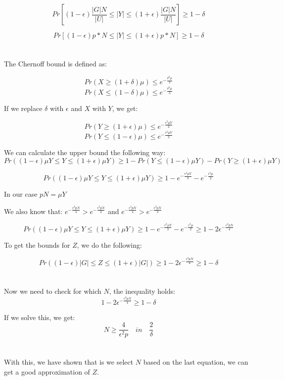 \documentclass[11pt]{article}
\begin{document}
$$ Pr \left[(1-\epsilon) \frac{|G|N}{|U|} \leq |Y| \leq (1+\epsilon)\frac{|G|N}{|U|} \right] \geq 1-\delta $$

$$ Pr \left[(1-\epsilon) p*N \leq |Y| \leq (1+\epsilon) p*N \right] \geq 1-\delta $$
\\~\\
The Chernoff bound is defined as:

$$ Pr(X \geq (1 + \delta) \mu) \leq e^{-\frac{\delta ^ 2 \mu}{2}}  $$
$$ Pr(X \leq (1 - \delta) \mu) \leq e^{-\frac{\delta ^ 2 \mu}{3}}  $$

If we replace $ \delta $ with $ \epsilon $ and $ X $ with $ Y $, we get:

$$ Pr(Y \geq (1 + \epsilon) \mu) \leq e^{-\frac{\epsilon ^ 2 \mu Y}{2}}  $$
$$ Pr(Y \leq (1 - \epsilon) \mu) \leq e^{-\frac{\epsilon ^ 2 \mu Y}{3}}  $$

We can calculate the upper bound the following way:
$$ Pr((1 - \epsilon) \mu Y \leq Y \leq (1 + \epsilon) \mu Y) \geq 1 - Pr(Y \leq (1 - \epsilon) \mu Y) - Pr(Y \geq (1 + \epsilon) \mu Y) $$

$$ Pr((1 - \epsilon) \mu Y \leq Y \leq (1 + \epsilon) \mu Y) \geq 1 - e^{-\frac{\epsilon ^ 2 \mu Y}{3}} - e^{-\frac{\epsilon ^ 2 \mu}{2}} $$

In our case $ pN = \mu Y $

We also know that: $ e^{-\frac{\epsilon ^ 2 pN}{4}} > e^{-\frac{\epsilon ^ 2 pN}{2}} $ and $ e^{-\frac{\epsilon ^ 2 pN}{4}} > e^{-\frac{\epsilon ^ 2 pN}{3}} $

$$ Pr((1 - \epsilon) \mu Y \leq Y \leq (1 + \epsilon) \mu Y) \geq 1 - e^{-\frac{\epsilon ^ 2 \mu Y}{3}} - e^{-\frac{\epsilon ^ 2 \mu}{2}} \geq 1 - 2\epsilon^{-\frac{\epsilon^2 pN}{4}} $$

To get the bounds for $ Z $, we do the following:

$$ Pr((1 - \epsilon)|G| \leq Z \leq (1 + \epsilon)|G|) \geq 1 - 2\epsilon^{-\frac{\epsilon^2 pN}{4}} \geq 1 - \delta $$
\\~\\
Now we need to check for which $ N $, the inequality holds:
$$ 1 - 2\epsilon^{-\frac{\epsilon^2 pN}{4}} \geq 1 - \delta $$

If we solve this, we get:
$$ N \geq \frac{4}{\epsilon ^2 p} \quad in \quad \frac{2}{\delta} $$
\\~\\
With this, we have shown that is we select $ N $ based on the last equation, we can get a good approximation of $ Z $.
\\~\\
\end{document}
